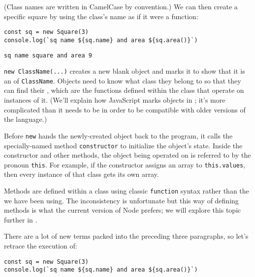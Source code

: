 \noindent
(Class names are written in CamelCase by convention.)
We can then create a specific square by using the class's name as if it were a function:

\begin{verbatim}
const sq = new Square(3)
console.log(`sq name ${sq.name} and area ${sq.area()}`)
\end{verbatim}

\begin{verbatim}
sq name square and area 9
\end{verbatim}

\texttt{new\ ClassName(...)} creates a new blank object
and marks it to show that it is an  of \texttt{ClassName}.
Objects need to know what class they belong to
so that they can find their ,
which are the functions defined within the class
that operate on instances of it.
(We'll explain how JavaScript marks objects in ;
it's more complicated than it needs to be
in order to be compatible with older versions of the language.)

Before \texttt{new} hands the newly-created object back to the program,
it calls the specially-named method \texttt{constructor} to initialize the object's state.
Inside the constructor and other methods,
the object being operated on is referred to by the pronoun \texttt{this}.
For example,
if the constructor assigns an array to \texttt{this.values},
then every instance of that class gets its own array.

Methods are defined within a class using classic \texttt{function} syntax
rather than the  we have been using.
The inconsistency is unfortunate
but this way of defining methods is what the current version of Node prefers;
we will explore this topic further in .

There are a lot of new terms packed into the preceding three paragraphs,
so let's retrace the execution of:

\begin{verbatim}
const sq = new Square(3)
console.log(`sq name ${sq.name} and area ${sq.area()}`)
\end{verbatim}

